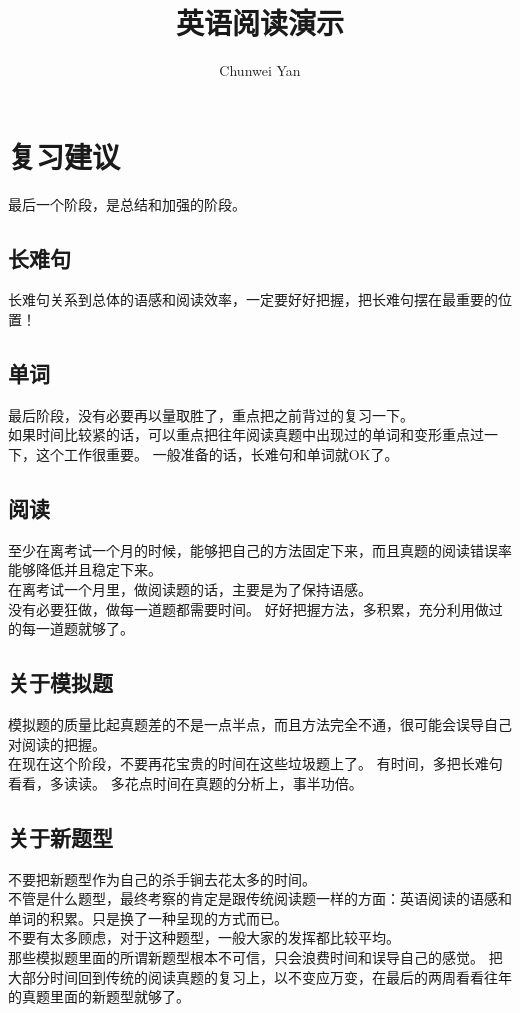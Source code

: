 \documentclass[a4paper]{ctexart}
\author{Chunwei Yan}
\title{英语阅读演示}
\begin{document}
    \maketitle
\section{复习建议}
最后一个阶段，是总结和加强的阶段。
\subsection{长难句}
长难句关系到总体的语感和阅读效率，一定要好好把握，把长难句摆在最重要的位置！
\subsection{单词}
最后阶段，没有必要再以量取胜了，重点把之前背过的复习一下。\\
如果时间比较紧的话，可以重点把往年阅读真题中出现过的单词和变形重点过一下，这个工作很重要。 一般准备的话，长难句和单词就OK了。
\subsection{阅读}
至少在离考试一个月的时候，能够把自己的方法固定下来，而且真题的阅读错误率能够降低并且稳定下来。\\
在离考试一个月里，做阅读题的话，主要是为了保持语感。\\ 
没有必要狂做，做每一道题都需要时间。 好好把握方法，多积累，充分利用做过的每一道题就够了。

\subsection{关于模拟题}
模拟题的质量比起真题差的不是一点半点，而且方法完全不通，很可能会误导自己对阅读的把握。\\
在现在这个阶段，不要再花宝贵的时间在这些垃圾题上了。 有时间，多把长难句看看，多读读。 多花点时间在真题的分析上，事半功倍。

\subsection{关于新题型}
不要把新题型作为自己的杀手锏去花太多的时间。 \\
不管是什么题型，最终考察的肯定是跟传统阅读题一样的方面：英语阅读的语感和单词的积累。只是换了一种呈现的方式而已。\\
不要有太多顾虑，对于这种题型，一般大家的发挥都比较平均。 \\
那些模拟题里面的所谓新题型根本不可信，只会浪费时间和误导自己的感觉。 把大部分时间回到传统的阅读真题的复习上，以不变应万变，在最后的两周看看往年的真题里面的新题型就够了。
\end{document}
